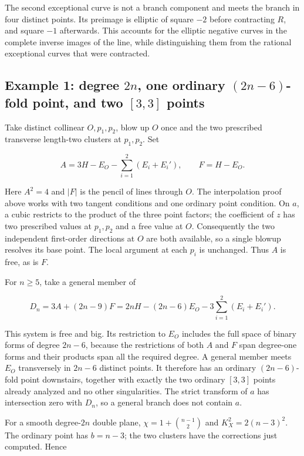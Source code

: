 The second exceptional curve is not a branch component and meets the branch in four distinct points. Its preimage is elliptic of square \(-2\) before contracting \(R\), and square \(-1\) afterwards. This accounts for the elliptic negative curves in the complete inverse images of the line, while distinguishing them from the rational exceptional curves that were contracted.

\subsection{\texorpdfstring{Example 1: degree \(2n\), one ordinary \((2n-6)\)-fold point, and two \([3,3]\) points}{Example 1: degree 2n, one ordinary (2n-6)-fold point, and two {[}3,3{]} points}}

Take distinct collinear \(O,p_1,p_2\), blow up \(O\) once and the two prescribed transverse length-two clusters at \(p_1,p_2\). Set

\[
A=3H-E_O-\sum_{i=1}^2(E_i+E_i'),\qquad F=H-E_O.
\]

Here \(A^2=4\) and \(|F|\) is the pencil of lines through \(O\). The interpolation proof above works with two tangent conditions and one ordinary point condition. On \(a\), a cubic restricts to the product of the three point factors; the coefficient of \(z\) has two prescribed values at \(p_1,p_2\) and a free value at \(O\). Consequently the two independent first-order directions at \(O\) are both available, so a single blowup resolves its base point. The local argument at each \(p_i\) is unchanged. Thus \(A\) is free, as is \(F\).

For \(n\ge 5\), take a general member of

\[
D_n=3A+(2n-9)F
=2nH-(2n-6)E_O-3\sum_{i=1}^2(E_i+E_i').
\tag{IV.18.5}
\]

This system is free and big. Its restriction to \(E_O\) includes the full space of binary forms of degree \(2n-6\), because the restrictions of both \(A\) and \(F\) span degree-one forms and their products span all the required degree. A general member meets \(E_O\) transversely in \(2n-6\) distinct points. It therefore has an ordinary \((2n-6)\)-fold point downstairs, together with exactly the two ordinary \([3,3]\) points already analyzed and no other singularities. The strict transform of \(a\) has intersection zero with \(D_n\), so a general branch does not contain \(a\).

For a smooth degree-\(2n\) double plane, \(\chi=1+\binom{n-1}{2}\) and \(K_X^2=2(n-3)^2\). The ordinary point has \(b=n-3\); the two clusters have the corrections just computed. Hence

